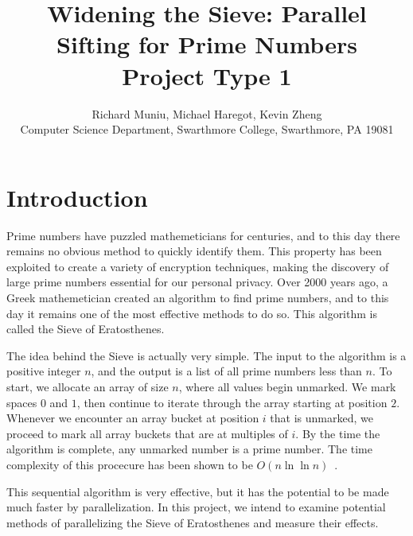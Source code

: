 \documentclass[11pt]{article}
\begin{document}

\title{%
Widening the Sieve: Parallel Sifting for Prime Numbers \\
\large Project Type 1}

\author{Richard Muniu, Michael Haregot, Kevin Zheng \\ 
Computer Science Department, Swarthmore College, Swarthmore, PA  19081}

\maketitle

\section {Introduction}\label{intro} 

Prime numbers have puzzled mathemeticians for centuries, and to this
day there remains no obvious method to quickly identify them.
This property has been exploited to create a variety of encryption
techniques, making the discovery of large prime numbers essential
for our personal privacy. Over 2000 years ago, a Greek mathemetician
created an algorithm to find prime numbers, and to this day it remains
one of the most effective methods to do so. This algorithm is called
the Sieve of Eratosthenes.

The idea behind the Sieve is actually very simple. The input to the
algorithm is a positive integer $n$, and the output is a list
of all prime numbers less than $n$. To start, we allocate an array
of size $n$, where all values begin unmarked. We mark spaces $0$ and
$1$, then continue to iterate through the array starting at position
$2$. Whenever we encounter an array bucket at position $i$ that is
unmarked, we proceed to mark all array buckets that are at multiples
of $i$. By the time the algorithm is complete, any unmarked number
is a prime number. The time complexity of this procecure has been
shown to be $O(n\ln{\ln{n}})$~\cite{Wirian}.

This sequential algorithm is very effective, but it has the potential
to be made much faster by parallelization. In this project, we intend
to examine potential methods of parallelizing the Sieve of Eratosthenes
and measure their effects.
\end{document}

